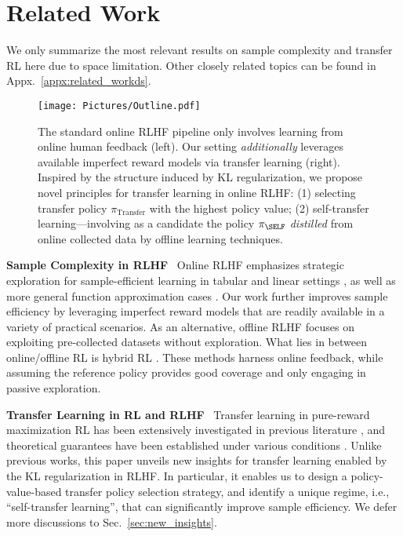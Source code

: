 \section{Related Work}
%

We only summarize the most relevant results on sample complexity and transfer RL here due to space limitation. Other closely related topics can be found in Appx.~\ref{appx:related_workds}.

\begin{figure}[t]
    \centering
    \texttt{[image: Pictures/Outline.pdf]}
    \caption{The standard online RLHF pipeline only involves learning from online human feedback (left).
    Our setting \emph{additionally} leverages available imperfect reward models via transfer learning (right).
    Inspired by the structure induced by KL regularization, we propose novel principles for transfer learning in online RLHF: (1) selecting transfer policy $\pi_\text{Transfer}$ with the highest policy value; (2) self-transfer learning---involving as a candidate the policy $\pi_\SELF$ \emph{distilled} from online collected data by offline learning techniques.
    }\label{fig:outline}
\end{figure}
\textbf{Sample Complexity in RLHF}~
Online RLHF emphasizes strategic exploration for sample-efficient learning in tabular and linear settings \citep{xu2020preference, novoseller2020dueling, pacchiano2021dueling, du2024exploration}, as well as more general function approximation cases \citep{ye2024theoretical, chen2022human, wang2023rlhf,xie2024exploratory,cen2024value,zhang2024self,xiong2024iterative}.
%
Our work further improves sample efficiency by leveraging imperfect reward models that are readily available in a variety of practical scenarios. 
%
%
%
As an alternative, offline RLHF \citep{zhan2023provable, liu2024provably, huang2024correcting} focuses on exploiting pre-collected datasets without exploration.
%
%
What lies in between online/offline RL is hybrid RL \citep{chang2024dataset, gao2024rebel}.
These methods harness online feedback, while assuming the reference policy provides good coverage and only engaging in passive exploration.


\textbf{Transfer Learning in RL and RLHF}~
Transfer learning in pure-reward maximization RL has been extensively investigated in previous literature \citep{taylor2009transfer, zhu2023transfer}, and theoretical guarantees have been established under various conditions \citep{mann2013directed, huang2022tiered,huang2023robust, golowich2022can}. Unlike previous works, this paper unveils new insights for transfer learning enabled by the KL regularization in RLHF. In particular, it enables us to design a policy-value-based transfer policy selection strategy, and identify a unique regime, i.e., ``self-transfer learning'', that can significantly improve sample efficiency.
We defer more discussions to Sec.~\ref{sec:new_insights}.
%
%
%

